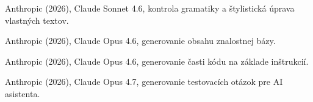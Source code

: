 \begin{trivlist}
\item Anthropic (2026), Claude Sonnet 4.6, kontrola gramatiky a štylistická úprava vlastných textov.

\item Anthropic (2026), Claude Opus 4.6, generovanie obsahu znalostnej bázy.

\item Anthropic (2026), Claude Opus 4.6, generovanie časti kódu na základe inštrukcií.

\item Anthropic (2026), Claude Opus 4.7, generovanie testovacích otázok pre AI asistenta.

\end{trivlist}